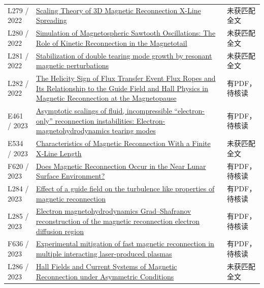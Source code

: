 \begin{longtable}{P{24mm}P{97mm}P{27mm}}
L279 / 2022 & \href{https://doi.org/10.33915/etd.11608}{Scaling Theory of 3D Magnetic Reconnection X-Line Spreading} & 未获匹配全文\\

L280 / 2022 & \href{https://doi.org/10.1029/2022gl099638}{Simulation of Magnetospheric Sawtooth Oscillations: The Role of Kinetic Reconnection in the Magnetotail} & 未获匹配全文\\

L281 / 2022 & \href{https://doi.org/10.1088/1741-4326/ac8f59}{Stabilization of double tearing mode growth by resonant magnetic perturbations} & 未获匹配全文\\

L282 / 2022 & \href{https://doi.org/10.1029/2022ja030686}{The Helicity Sign of Flux Transfer Event Flux Ropes and Its Relationship to the Guide Field and Hall Physics in Magnetic Reconnection at the Magnetopause} & 有PDF，待核读\\

E461 / 2023 & \href{https://doi.org/10.1063/5.0155211}{Asymptotic scalings of fluid,  incompressible “electron-only” reconnection instabilities: Electron-magnetohydrodynamics tearing modes} & 有PDF，待核读\\

E534 / 2023 & \href{https://doi.org/10.1029/2022ja031209}{Characteristics of Magnetic Reconnection With a Finite X‐Line Length} & 未获匹配全文\\

F620 / 2023 & \href{https://doi.org/10.1029/2023gl104733}{Does Magnetic Reconnection Occur in the Near Lunar Surface Environment?} & 有PDF，待核读\\

L284 / 2023 & \href{https://doi.org/10.1063/5.0150929}{Effect of a guide field on the turbulence like properties of magnetic reconnection} & 有PDF，待核读\\

L285 / 2023 & \href{https://doi.org/10.3389/fspas.2023.1069888}{Electron magnetohydrodynamics Grad–Shafranov reconstruction of the magnetic reconnection electron diffusion region} & 有PDF，待核读\\

F636 / 2023 & \href{https://doi.org/10.48550/arxiv.2305.05701}{Experimental mitigation of fast magnetic reconnection in multiple interacting laser-produced plasmas} & 有PDF，待核读\\

L286 / 2023 & \href{https://doi.org/10.3847/1538-4357/aca760}{Hall Fields and Current Systems of Magnetic Reconnection under Asymmetric Conditions} & 未获匹配全文\\


\end{longtable}
